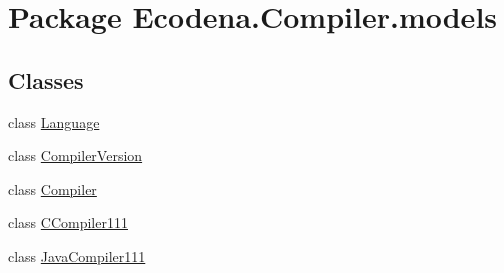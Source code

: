 \hypertarget{namespace_ecodena_1_1_compiler_1_1models}{
\section{Package Ecodena.Compiler.models}
\label{d2/d05/namespace_ecodena_1_1_compiler_1_1models}
}
\subsection*{Classes}
\begin{DoxyCompactItemize}
\item 
class \hyperlink{class_ecodena_1_1_compiler_1_1models_1_1_language}{Language}
\item 
class \hyperlink{class_ecodena_1_1_compiler_1_1models_1_1_compiler_version}{CompilerVersion}
\item 
class \hyperlink{class_ecodena_1_1_compiler_1_1models_1_1_compiler}{Compiler}
\item 
class \hyperlink{class_ecodena_1_1_compiler_1_1models_1_1_c_compiler111}{CCompiler111}
\item 
class \hyperlink{class_ecodena_1_1_compiler_1_1models_1_1_java_compiler111}{JavaCompiler111}
\end{DoxyCompactItemize}
